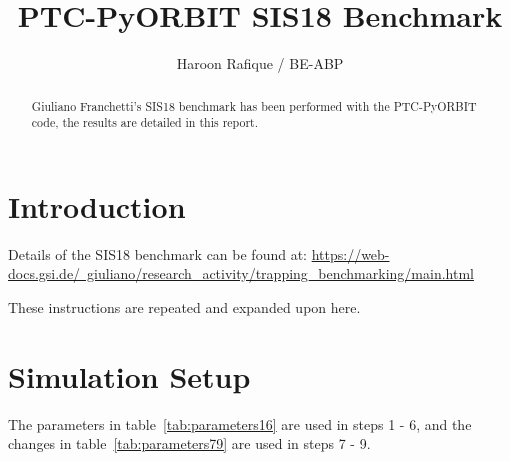 \documentclass[a4paper]{cernatsnote}
\title{PTC-PyORBIT SIS18 Benchmark}
\author{Haroon Rafique / BE-ABP}
\def \gsiSISpage {\href{https://web-docs.gsi.de/~giuliano/research_activity/trapping_benchmarking/main.html}{https://web-docs.gsi.de/~giuliano/research\_activity/trapping\_benchmarking/main.html}}
\begin{document}
	
\maketitle %

\begin{abstract}
	Giuliano Franchetti's SIS18 benchmark has been performed with the PTC-PyORBIT code, the results are detailed in this report.
\end{abstract}

\section{Introduction}
\label{sec:intro}

Details of the SIS18 benchmark can be found at:
\gsiSISpage

These instructions are repeated and expanded upon here. 
	
\section{Simulation Setup}

The parameters in table~\ref{tab:parameters16} are used in steps 1 - 6, and the changes in table~\ref{tab:parameters79} are used in steps 7 - 9.
\end{document}
